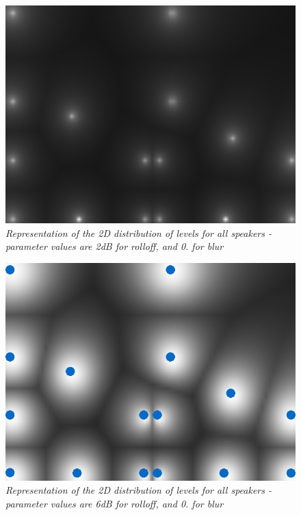 \documentclass[twoside,10pt]{article}
\begin{document}
\begin{figure}[ht]
\centerline{\includegraphics[scale=0.5]{all_r_2_b_0}}
\caption{{\it Representation of the 2D distribution of levels for all speakers - parameter values are 2dB for rolloff, and 0. for blur}}  
\label{Level distribution for all speakers}
\end{figure}

\begin{figure}[ht]
\centerline{\includegraphics[scale=0.5]{all_r_6_b_0}}
\caption{{\it Representation of the 2D distribution of levels for all speakers - parameter values are 6dB for rolloff, and 0. for blur}}  
\label{Level distribution for all speakers}
\end{figure}
\end{document}
